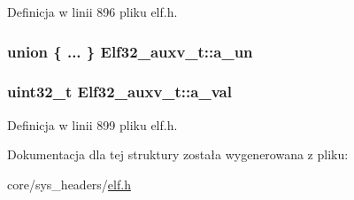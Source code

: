 Definicja w linii 896 pliku elf.\-h.

\hypertarget{struct_elf32__auxv__t_afe17fc70719136f46462ccd117875236}{
\subsubsection[{a\-\_\-un}]{\setlength{\rightskip}{0pt plus 5cm}union \{ ... \}   Elf32\-\_\-auxv\-\_\-t\-::a\-\_\-un}}\label{struct_elf32__auxv__t_afe17fc70719136f46462ccd117875236}
\hypertarget{struct_elf32__auxv__t_a527cb12aa61f2b93e67e72b2d9bb6312}{
\subsubsection[{a\-\_\-val}]{\setlength{\rightskip}{0pt plus 5cm}uint32\-\_\-t Elf32\-\_\-auxv\-\_\-t\-::a\-\_\-val}}\label{struct_elf32__auxv__t_a527cb12aa61f2b93e67e72b2d9bb6312}


Definicja w linii 899 pliku elf.\-h.



Dokumentacja dla tej struktury została wygenerowana z pliku\-:\begin{DoxyCompactItemize}
\item 
core/sys\-\_\-headers/\hyperlink{elf_8h}{elf.\-h}\end{DoxyCompactItemize}
